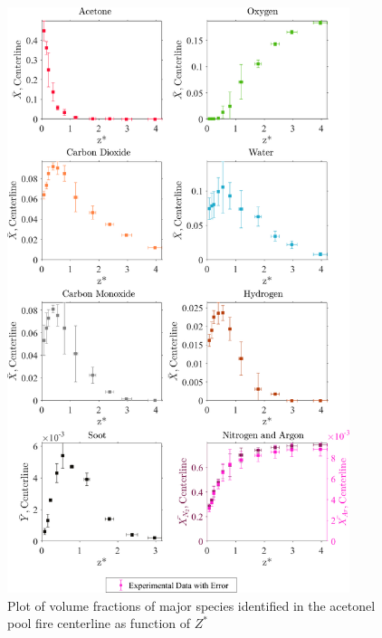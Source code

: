 \documentclass[12pt]{article}
\begin{document}
\begin{figure}[!h]
	\centering
\includegraphics[width=10.0cm,keepaspectratio]{Acetone_MOL_FRAC_Plot.png}
	\caption[Plot of volume fractions, with error, of major species identified in the acetone pool fire centerline as function of $Z^{*}$]{Plot of volume fractions of major species identified in the acetonel pool fire centerline as function of $Z^{*}$}
	\label{fig:Methanol_VOL_Frac_Major}
\end{figure}
\end{document}
